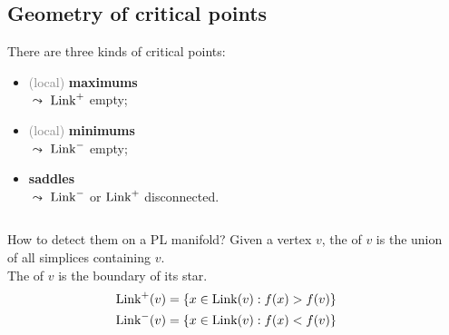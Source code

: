 \documentclass[10pt]{beamer}
\begin{document}
\subsection{Geometry of critical points}
\begin{frame*}
There are three kinds of critical points:
\begin{itemize}
\item \textcolor{gray}{(local)} \textbf{maximums}\\
$\leadsto$ $\operatorname{Link}^+$ empty;
\item \textcolor{gray}{(local)} \textbf{minimums}\\
$\leadsto$ $\operatorname{Link}^-$ empty;
\item \textbf{saddles}\\
$\leadsto$ $\operatorname{Link}^-$ or $\operatorname{Link}^+$ disconnected.
\end{itemize}
\begin{columns}[T,onlytextwidth]
\begin{column}{.65\textwidth}
\begin{block}{How to detect them on a PL manifold?}
Given a vertex $v$, the  of $v$ is the union of all simplices containing $v$.\\
The  of $v$ is the boundary of its star.
\begin{align*}
\operatorname{Link}^+(v)&=\left\{x\in\operatorname{Link}(v):f(x)>f(v)\right\}\\
\operatorname{Link}^-(v)&=\left\{x\in\operatorname{Link}(v):f(x)<f(v)\right\}\\
\end{align*}
\end{block}
\end{column}
\begin{column}{.35\textwidth}
\end{column}
\end{columns}
\end{frame*}
\end{document}

